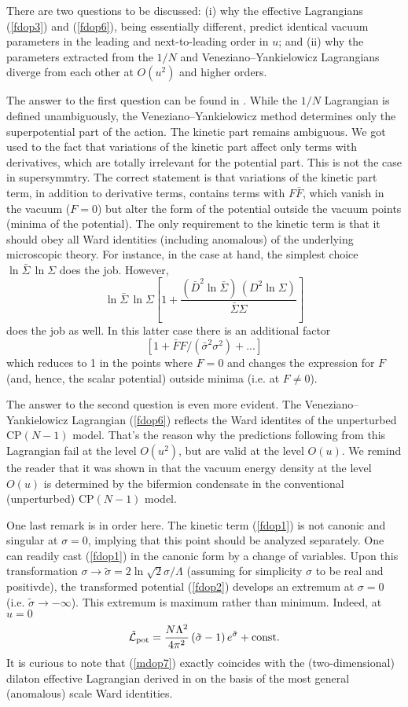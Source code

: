 \documentclass[epsfig,12pt]{article}
\def\beq{\begin{equation}}
\def\eeq{\end{equation}}
\def\beq{\begin{equation}}
\def\eeq{\end{equation}}
\begin{document}
{There are two questions to be discussed: (i) why the effective Lagrangians  (\ref{fdop3}) and (\ref{fdop6}),
 being essentially different, predict identical vacuum parameters in the leading and next-to-leading order in $u$;
 and (ii) why the  parameters extracted from the $1/N$ and Veneziano--Yankielowicz Lagrangians diverge 
 from each other at $O(u^2)$ and  higher orders.

The answer to the first question can be found in \cite{AdDVecSal}. While  the $1/N$ 
Lagrangian is defined unambiguously, the Veneziano--Yankielowicz method determines only the
superpotential part of the action. The kinetic part remains ambiguous. We got used to the fact that
variations of the kinetic part affect only terms with derivatives, which are totally irrelevant for the
potential part. This is not the case in supersymmtry.
The correct statement is that variations of the kinetic part term, in addition to derivative terms,
contains terms with $F\bar F$, which vanish in the vacuum ($F=0$) but alter the form of the potential outside
the vacuum points (minima of the potential). The only requirement to the kinetic term is that
it should obey all Ward identities (including anomalous) of the underlying microscopic theory.
For instance, in the case at hand, the simplest choice $\ln\bar\Sigma\, \ln \Sigma $
does the job. However, 
$$
\ln\bar\Sigma\, \ln \Sigma \left[1+ \frac{(\bar{D}^2 \ln\bar\Sigma)\, ({D}^2\ln \Sigma )}{\bar\Sigma\Sigma }
\right]
$$
does the job as well. In this latter case there is an additional factor
$$
\left[1 +\bar FF/(\bar\sigma^2\sigma^2)   +...  \right] $$
which reduces to 1 in the points where $F=0$ and changes the expression for $F$ (and, hence, the scalar potential)
outside minima (i.e. at $F\neq 0$).

The answer to the second question is even more evident.
The Veneziano--Yankielowicz Lagrangian (\ref{fdop6}) reflects the Ward identites
of the unperturbed CP$(N-1)$ model. That's the reason why the predictions following from this
Lagrangian fail at the level $O(u^2)$, but are valid at the level $O(u)$. 
We remind the reader that it was shown in \cite{SY1} that the vacuum energy density
at the level $O(u)$ is determined by the bifermion condensate in the 
conventional (unperturbed) CP$(N-1)$ model.

One last remark is in order here.
The kinetic term (\ref{fdop1}) is not canonic and singular at $\sigma=0$, implying that this point should be analyzed separately.
One can readily cast (\ref{fdop1}) in the canonic form by a change of variables. Upon this transformation 
$\sigma\to \tilde 
\sigma =2 \ln\sqrt{2}\sigma/\Lambda$ (assuming for simplicity $\sigma$ to be real and positivde),
the transformed potential (\ref{fdop2})    develops an extremum at 
$\sigma = 0$ (i.e. $\tilde\sigma \to -\infty$). This extremum is maximum rather than minimum.
Indeed, at $u=0$
\beq
\tilde{\mathcal L}_{\rm pot} = \frac{N\Lambda^2}{4\pi^2}\,(\tilde\sigma - 1)\,e^{\tilde\sigma}
+{\rm const}.
\label{mdop7}
\eeq
It is curious to note that (\ref{mdop7}) exactly coincides with the (two-dimensional)
dilaton effective Lagrangian derived in \cite{SMMS} on the basis of the most general
(anomalous) scale Ward identities.

}
\end{document}
